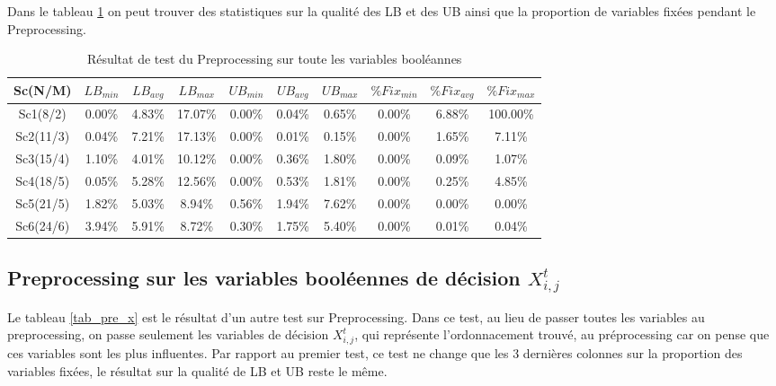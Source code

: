 \documentclass[twoside,fleqn]{EPURapport}
\begin{document}
Dans le tableau \ref{tab_pre} on peut trouver des statistiques sur la qualité des LB et des UB ainsi que la proportion de variables fixées pendant le Preprocessing.
\bigskip
\begin{table}[h]
    \centering
    \begin{tabular}{|c|c|c|c|c|c|c|c|c|c|}
    	\hline
    	Sc(N/M)	& $LB_{min}$ & $LB_{avg}$ & $LB_{max}$ & $UB_{min}$ & $UB_{avg}$ & $UB_{max}$ & $\%Fix_{min}$ & $\%Fix_{avg}$ & $\%Fix_{max}$\\ \hline
		Sc1(8/2) & 0.00\%  &4.83\%  &17.07\%  &0.00\% & 0.04\%  &0.65\%  &0.00\%  &6.88\%  &100.00\% \\ \hline
Sc2(11/3)&  0.04\% & 7.21\% & 17.13\% & 0.00\%&  0.01\% & 0.15\% & 0.00\% & 1.65\% & 7.11\%\\ \hline
Sc3(15/4)&  1.10\% & 4.01\% & 10.12\% & 0.00\%&  0.36\% & 1.80\% & 0.00\% & 0.09\% & 1.07\%\\ \hline
Sc4(18/5)&  0.05\% & 5.28\% & 12.56\% & 0.00\%&  0.53\% & 1.81\% & 0.00\% & 0.25\% & 4.85\%\\ \hline
Sc5(21/5)&  1.82\% & 5.03\% & 8.94\%  &0.56\% & 1.94\%  &7.62\%  &0.00\%  &0.00\%  &0.00\%\\ \hline
Sc6(24/6)&  3.94\% & 5.91\% & 8.72\%  &0.30\% & 1.75\%  &5.40\%  &0.00\%  &0.01\%  &0.04\%\\ \hline
    \end{tabular}
    \label{tab_pre}
    \caption{Résultat de test du Preprocessing sur toute les variables booléannes}
\end{table}
\bigskip

\subsection{Preprocessing sur les variables booléennes de décision $X^t_{i,j}$}
Le tableau \ref{tab_pre_x} est le résultat d'un autre test sur Preprocessing. Dans ce test, au lieu de passer toutes les variables au preprocessing, on passe seulement les variables de décision $X^t_{i,j}$, qui représente l'ordonnacement trouvé, au préprocessing car on pense que ces variables sont les plus influentes. Par rapport au premier test, ce test ne change que les 3 dernières colonnes sur la proportion des variables fixées, le résultat sur la qualité de LB et UB reste le même.
\end{document}
